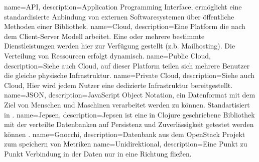 {
  name=API,
  description={Application Programming Interface, ermöglicht eine
               standardisierte Anbindung von externen Softwaresystemen über
               öffentliche Methoden einer Bibliothek.\cite{HowDoAPIsEvolve}}
}
{
  name=Cloud,
  description={Eine Platform die nach dem Client-Server Modell arbeitet. Eine
               oder mehrere bestimmte Dienstleistungen werden hier zur
               Verfügung gestellt (z.b. Mailhosting). Die Verteilung von
               Ressourcen erfolgt dynamisch.}
}
{
  name=Public Cloud,
  description={Siehe auch \gls{Cloud}, auf dieser Platform teilen sich mehrere
               Benutzer die gleiche physische Infrastruktur.}
}
{
  name=Private Cloud,
  description={Siehe auch \gls{Cloud}, Hier wird jedem Nutzer eine dedizierte
               Infrastruktur bereitgestellt.}
}
{
  name=JSON,
  description={JavaScript Object Notation, ein Datenformat mit dem Ziel von
               Menschen und Maschinen verarbeitet werden zu können.
               Standartisiert in \cite{RFC7159}.}
}
{
  name=Jepsen,
  description={Jepsen ist eine in Clojure geschriebene Bibliothek mit der
               verteilte Datenbanken auf Persistenz und Zuverlässigkeit
               getestet werden können \cite{Jepsen_Introduction}.}
}
{
  name=Gnocchi,
  description={Datenbank aus dem OpenStack Projekt zum speichern von Metriken}
}
{
  name=Unidirektional,
  description={Eine Punkt zu Punkt Verbindung in der Daten nur in eine Richtung
               fließen.}
}
